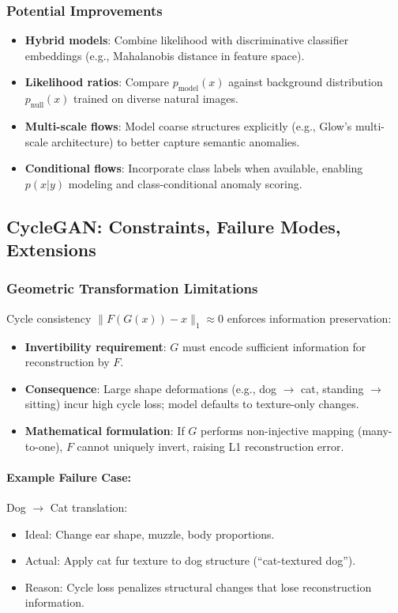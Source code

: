 \documentclass[conference]{IEEEtran}
\begin{document}
\subsubsection{Potential Improvements}
\begin{itemize}
\item \textbf{Hybrid models}: Combine likelihood with discriminative classifier embeddings (e.g., Mahalanobis distance in feature space).
\item \textbf{Likelihood ratios}: Compare $p_{\text{model}}(x)$ against background distribution $p_{\text{null}}(x)$ trained on diverse natural images.
\item \textbf{Multi-scale flows}: Model coarse structures explicitly (e.g., Glow's multi-scale architecture) to better capture semantic anomalies.
\item \textbf{Conditional flows}: Incorporate class labels when available, enabling $p(x|y)$ modeling and class-conditional anomaly scoring.
\end{itemize}

\subsection{CycleGAN: Constraints, Failure Modes, Extensions}
\subsubsection{Geometric Transformation Limitations}
Cycle consistency $\|F(G(x)) - x\|_1 \approx 0$ enforces information preservation:
\begin{itemize}
\item \textbf{Invertibility requirement}: $G$ must encode sufficient information for reconstruction by $F$.
\item \textbf{Consequence}: Large shape deformations (e.g., dog $\to$ cat, standing $\to$ sitting) incur high cycle loss; model defaults to texture-only changes.
\item \textbf{Mathematical formulation}: If $G$ performs non-injective mapping (many-to-one), $F$ cannot uniquely invert, raising L1 reconstruction error.
\end{itemize}

\paragraph{Example Failure Case:} Dog $\to$ Cat translation:
\begin{itemize}
\item Ideal: Change ear shape, muzzle, body proportions.
\item Actual: Apply cat fur texture to dog structure (``cat-textured dog'').
\item Reason: Cycle loss penalizes structural changes that lose reconstruction information.
\end{itemize}
\end{document}
